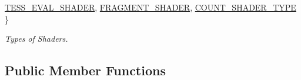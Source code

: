 \begin{DoxyCompactItemize}
\hyperlink{class_v_s_shader_lib_ae8a4410569faa6d4df9760e998a9706aa739147ed432c1e1d34aed0c3f0161cf4}{T\+E\+S\+S\+\_\+\+E\+V\+A\+L\+\_\+\+S\+H\+A\+D\+ER}, 
\newline
\hyperlink{class_v_s_shader_lib_ae8a4410569faa6d4df9760e998a9706aadffaa9eef2ac65da746c880c7438939e}{F\+R\+A\+G\+M\+E\+N\+T\+\_\+\+S\+H\+A\+D\+ER}, 
\hyperlink{class_v_s_shader_lib_ae8a4410569faa6d4df9760e998a9706aa112e7924ef9a87ad0d894fe216f84e39}{C\+O\+U\+N\+T\+\_\+\+S\+H\+A\+D\+E\+R\+\_\+\+T\+Y\+PE}
 \}\begin{DoxyCompactList}\small\item\em Types of Shaders. \end{DoxyCompactList}
\end{DoxyCompactItemize}
\subsection*{Public Member Functions}
